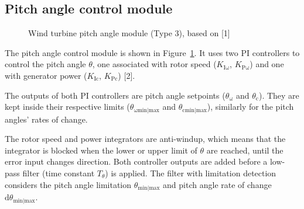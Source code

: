 \documentclass[
  a4paper,
  DIV=11,
  numbers=noendperiod]{scrartcl}
\begin{document}
\subsection{Pitch angle control
module}\label{pitch-angle-control-module}

\begin{figure}


\caption{\label{fig-wtPitchAngleControl}Wind turbine pitch angle module
(Type 3), based on {[}1{]}}

\end{figure}%

The pitch angle control module is shown in
Figure~\ref{fig-wtPitchAngleControl}. It uses two PI controllers to
control the pitch angle \(\theta\), one associated with rotor speed
(\(K_\mathrm{I\omega}\), \(K_\mathrm{P\omega}\)) and one with generator
power (\(K_\mathrm{Ic}\), \(K_\mathrm{Pc}\)) {[}2{]}.

The outputs of both PI controllers are pitch angle setpoints
(\(\theta_\mathrm{\omega}\) and \(\theta_\mathrm{c}\)). They are kept
inside their respective limits (\(\theta_\mathrm{\omega min|max}\) and
\(\theta_\mathrm{cmin|max}\)), similarly for the pitch angles' rates of
change.

The rotor speed and power integrators are anti-windup, which means that
the integrator is blocked when the lower or upper limit of \(\theta\)
are reached, until the error input changes direction. Both controller
outputs are added before a low-pass filter (time constant \(T_\theta\))
is applied. The filter with limitation detection considers the pitch
angle limitation \(\theta_\mathrm{min|max}\) and pitch angle rate of
change \(\mathrm{d}\theta_{\mathrm{min|max}}\).
\end{document}

